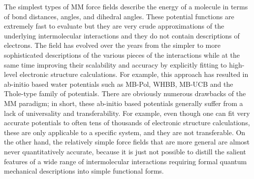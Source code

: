 \documentclass[11pt, proquest]{uwthesis}[2020/02/24]
\begin{document}
\par The simplest types of MM force fields describe the energy of a molecule in terms of bond distances, angles, and dihedral angles. These potential functions are extremely fast to evaluate but they are very crude approximations of the underlying intermolecular interactions and they do not contain descriptions of electrons. The field has evolved over the years from the simpler to more sophisticated descriptions of the various pieces of the interactions while at the same time improving their scalability and accuracy by explicitly fitting to high-level electronic structure calculations. For example, this approach has resulted in ab-initio based water potentials such as MB-Pol\autocite{babin_toward_2012,babin_development_2013,babin_development_2014,medders_development_2014}, WHBB\autocite{wang_full-dimensional_2009,wang_towards_2010,wang_flexible_2011}, MB-UCB\autocite{das_development_2019} and the Thole-type family of potentials.\autocite{fanourgakis_flexible_2006,fanourgakis_development_2008,burnham_development_2002} There are obviously numerous drawbacks of the MM paradigm; in short, these ab-initio based potentials generally suffer from a lack of universality and transferability. For example, even though one can fit very accurate potentials to often tens of thousands of electronic structure calculations, these are only applicable to a specific system, and they are not transferable. On the other hand, the relatively simple force fields that are more general are almost never quantitatively accurate, because it is just not possible to distill the salient features of a wide range of intermolecular interactions requiring formal quantum mechanical descriptions into simple functional forms.
\end{document}
